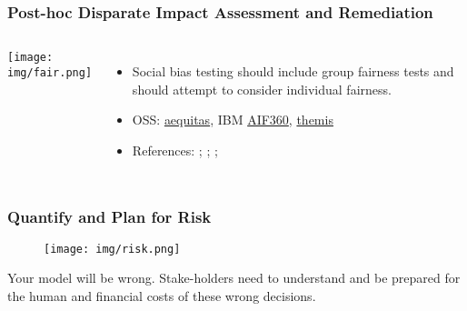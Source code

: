 \documentclass[11pt,
               aspectratio=169,
               hyperref={colorlinks}
               ]{beamer}
\begin{document}
			\begin{frame}		
			
				\frametitle{Post-hoc Disparate Impact Assessment and Remediation}		
				
				\begin{columns}
		
					\centering
					\texttt{[image: img/fair.png]}
					
					\vspace{-5pt}
					\begin{itemize}
						\item Social bias testing should include group fairness tests and should attempt to consider individual fairness. 
						\item OSS: \href{https://github.com/dssg/aequitas}{aequitas}, IBM \href{https://github.com/IBM/AIF360}{AIF360}, \href{https://github.com/LASER-UMASS/Themis}{themis}
						\item References: ; ; ;  
					\end{itemize}
					
				\end{columns}
			
			\end{frame}
	
			\begin{frame}
			
				\frametitle{Quantify and Plan for Risk}	
				
				\begin{figure}[htb]
					\begin{center}
						\texttt{[image: img/risk.png]}
						\end{center}
					\end{figure}	
	
				\vspace{-10pt}
				\scriptsize{Your model will be wrong. Stake-holders need to understand and be prepared for the human and financial costs of these wrong decisions.}	
					
			\end{frame}
	
\end{document}
